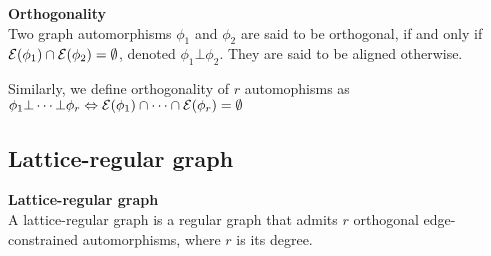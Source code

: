 \begin{definition}\textbf{Orthogonality}\\
Two graph automorphisms $\phi_1$ and $\phi_2$ are said to be orthogonal, if and only if $\mathcal{E}(\phi_1) \cap \mathcal{E}(\phi_2) = \emptyset$, denoted $\phi_1 \bot \phi_2$. They are said to be aligned otherwise.

Similarly, we define orthogonality of $r$ automophisms as $\phi_1 \bot \cdots \bot \phi_r \Leftrightarrow \mathcal{E}(\phi_1) \cap \cdots \cap \mathcal{E}(\phi_r) = \emptyset$
\end{definition}


\subsection{Lattice-regular graph}


\begin{definition}\textbf{Lattice-regular graph}\\
A lattice-regular graph is a regular graph that admits $r$ orthogonal edge-constrained automorphisms, where $r$ is its degree.
\end{definition}






